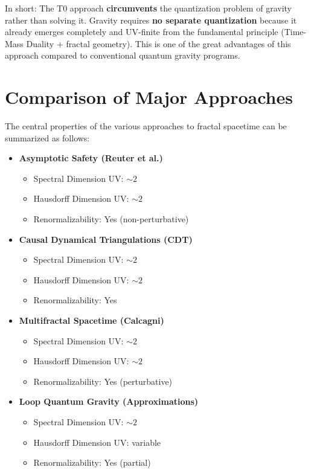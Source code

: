 	In short: The T0 approach \textbf{circumvents} the quantization problem of gravity rather than solving it. Gravity requires \textbf{no separate quantization} because it already emerges completely and UV-finite from the fundamental principle (Time-Mass Duality + fractal geometry). This is one of the great advantages of this approach compared to conventional quantum gravity programs.
	
	\section{Comparison of Major Approaches}
	
	The central properties of the various approaches to fractal spacetime can be summarized as follows:
	
	\begin{itemize}
		\item \textbf{Asymptotic Safety (Reuter et al.)}
		\begin{itemize}
			\item Spectral Dimension UV: $\sim 2$
			\item Hausdorff Dimension UV: $\sim 2$
			\item Renormalizability: Yes (non-perturbative)
		\end{itemize}
		
		\item \textbf{Causal Dynamical Triangulations (CDT)}
		\begin{itemize}
			\item Spectral Dimension UV: $\sim 2$
			\item Hausdorff Dimension UV: $\sim 2$
			\item Renormalizability: Yes
		\end{itemize}
		
		\item \textbf{Multifractal Spacetime (Calcagni)}
		\begin{itemize}
			\item Spectral Dimension UV: $\sim 2$
			\item Hausdorff Dimension UV: $\sim 2$
			\item Renormalizability: Yes (perturbative)
		\end{itemize}
		
		\item \textbf{Loop Quantum Gravity (Approximations)}
		\begin{itemize}
			\item Spectral Dimension UV: $\sim 2$
			\item Hausdorff Dimension UV: variable
			\item Renormalizability: Yes (partial)
		\end{itemize}
		

\end{itemize}
